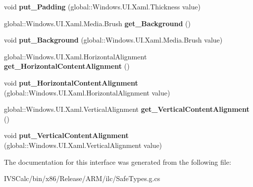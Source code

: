 \begin{DoxyCompactItemize}
void {\bfseries put\+\_\+\+Padding} (global\+::\+Windows.\+U\+I.\+Xaml.\+Thickness value)
\item 
\mbox{\label{interface_windows_1_1_u_i_1_1_xaml_1_1_controls_1_1_i_content_presenter4_a89f236cfa72e4352ba5ff825a2ec9f5a}} 
global\+::\+Windows.\+U\+I.\+Xaml.\+Media.\+Brush {\bfseries get\+\_\+\+Background} ()
\item 
\mbox{\label{interface_windows_1_1_u_i_1_1_xaml_1_1_controls_1_1_i_content_presenter4_a052301695cb479ae10c998256c35d352}} 
void {\bfseries put\+\_\+\+Background} (global\+::\+Windows.\+U\+I.\+Xaml.\+Media.\+Brush value)
\item 
\mbox{\label{interface_windows_1_1_u_i_1_1_xaml_1_1_controls_1_1_i_content_presenter4_a09a08983436a09edb0fcc2b73c746b45}} 
global\+::\+Windows.\+U\+I.\+Xaml.\+Horizontal\+Alignment {\bfseries get\+\_\+\+Horizontal\+Content\+Alignment} ()
\item 
\mbox{\label{interface_windows_1_1_u_i_1_1_xaml_1_1_controls_1_1_i_content_presenter4_ae336a6680b3867b8c159d802caafbe13}} 
void {\bfseries put\+\_\+\+Horizontal\+Content\+Alignment} (global\+::\+Windows.\+U\+I.\+Xaml.\+Horizontal\+Alignment value)
\item 
\mbox{\label{interface_windows_1_1_u_i_1_1_xaml_1_1_controls_1_1_i_content_presenter4_acb36f5224b57a6975ff61aeee1ab5f74}} 
global\+::\+Windows.\+U\+I.\+Xaml.\+Vertical\+Alignment {\bfseries get\+\_\+\+Vertical\+Content\+Alignment} ()
\item 
\mbox{\label{interface_windows_1_1_u_i_1_1_xaml_1_1_controls_1_1_i_content_presenter4_adb058d58f1fe8cb9afcc0b94b026986c}} 
void {\bfseries put\+\_\+\+Vertical\+Content\+Alignment} (global\+::\+Windows.\+U\+I.\+Xaml.\+Vertical\+Alignment value)
\end{DoxyCompactItemize}


The documentation for this interface was generated from the following file\+:\begin{DoxyCompactItemize}
\item 
I\+V\+S\+Calc/bin/x86/\+Release/\+A\+R\+M/ilc/Safe\+Types.\+g.\+cs\end{DoxyCompactItemize}
